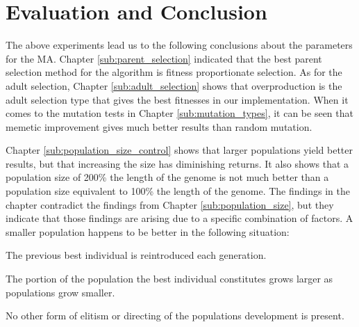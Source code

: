 


\section{Evaluation and Conclusion} %
\label{sec:evaluation_and_conclusion}

The above experiments lead us to the following conclusions about the parameters for the MA. Chapter \ref{sub:parent_selection} indicated that the best parent selection method for the algorithm is fitness proportionate selection. As for the adult selection, Chapter \ref{sub:adult_selection} shows that overproduction is the adult selection type that gives the best fitnesses in our implementation. When it comes to the mutation tests in Chapter \ref{sub:mutation_types}, it can be seen that memetic improvement gives much better results than random mutation.

Chapter \ref{sub:population_size_control} shows that larger populations yield better results, but that increasing the size has diminishing returns. It also shows that a population size of 200\% the length of the genome is not much better than a population size equivalent to 100\% the length of the genome. The findings in the chapter contradict the findings from Chapter \ref{sub:population_size}, but they indicate that those findings are arising due to a specific combination of factors. A smaller population happens to be better in the following situation:

\begin{compactitem}
    \item The previous best individual is reintroduced each generation.
    \item The portion of the population the best individual constitutes grows larger as populations grow smaller.
    \item No other form of elitism or directing of the populations development is present.
\end{compactitem}

